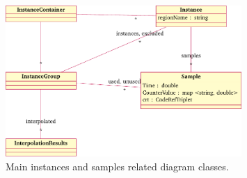 \begin{figure}
  \centering
  \includegraphics[width=0.80\textwidth]{figures/user-guide/tool-design-interpolate-instances.pdf}
  \caption{Main instances and samples related diagram classes.}
  \label{fig:tool_design_interpolate_instances}
\end{figure}
